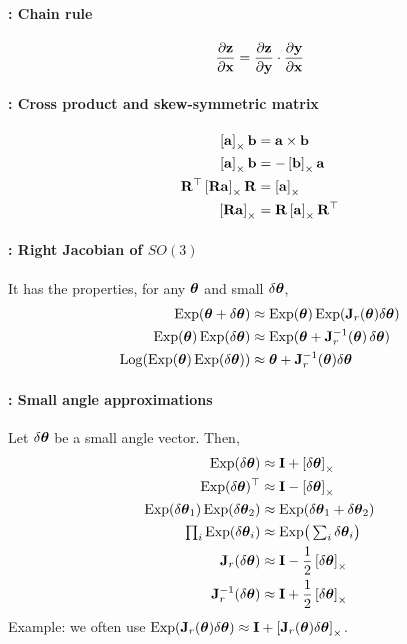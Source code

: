 \paragraph{\cchain : Chain rule}

\begin{align}
\dpar{\bfz}{\bfx} = \dpar{\bfz}{\bfy}\cdot\dpar{\bfy}{\bfx}
\end{align}

\paragraph{\ccross : Cross product and skew-symmetric matrix}

\begin{align}
\hatx{\bfa}\bfb &= \bfa\times\bfb \\
\hatx{\bfa}\bfb &= -\hatx{\bfb}\bfa \\
\bfR\tr\hatx{\bfR\bfa}\bfR &= \hatx{\bfa} \\
\hatx{\bfR\bfa} &= \bfR\hatx{\bfa}\bfR\tr 
\end{align}

\paragraph{\cJr : Right Jacobian of $SO(3)$ }

It has the properties, for any $\bth$ and small $\dth$,
%
\begin{align}
\Exp(\bth+\dth) &\approx \Exp(\bth)\Exp(\bfJ_r(\bth)\dth) \\
\Exp(\bth)\Exp(\dth) &\approx \Exp(\bth+\bfJ_r\inv(\bth)\,\dth) \\
\Log(\Exp(\bth)\Exp(\dth)) &\approx \bth+\bfJ_r\inv(\bth)\dth %
\end{align}
%






\paragraph{\csmall : Small angle approximations}

Let $\dth$ be a small angle vector. Then,
%
\begin{align}
\Exp(\dth) &\approx \bfI + \hatx{\dth} \\
\Exp(\dth)\tr &\approx \bfI - \hatx{\dth} \\
\Exp(\dth_1)\Exp(\dth_2) &\approx \Exp(\dth_1+\dth_2) \\
\textstyle\prod_i \Exp(\dth_i) &\approx \Exp\!\big(\textstyle\sum_i\dth_i\big) \\
\bfJ_r(\dth) &\approx \bfI - \frac12\hatx{\dth} \\
\bfJ_r\inv(\dth) &\approx \bfI + \frac12\hatx{\dth} 
\end{align}
%
Example: we often use $\Exp(\bfJ_r(\bth)\dth)\approx \bfI + \hatx{\bfJ_r(\bth)\dth}$.

